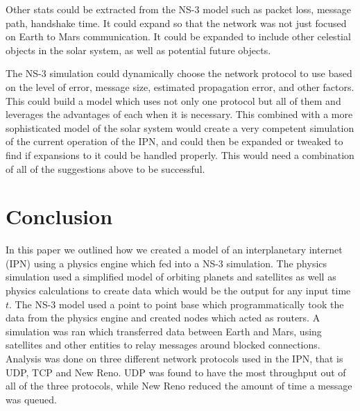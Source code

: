 \documentclass[a4paper,12pt]{article}
\begin{document}
Other stats could be extracted from the NS-3 model such as packet loss, message
path, handshake time. It could expand so that the network was not just focused
on Earth to Mars communication. It could be expanded to include other celestial
objects in the solar system, as well as potential future objects.

The NS-3 simulation could dynamically choose the network protocol to use based
on the level of error, message size, estimated propagation error, and other
factors. This could build a model which uses not only one protocol but all of
them and leverages the advantages of each when it is necessary. This combined
with a more sophisticated model of the solar system would create a very
competent simulation of the current operation of the IPN, and could then be
expanded or tweaked to find if expansions to it could be handled properly. This
would need a combination of all of the suggestions above to be successful.

\section{Conclusion}

In this paper we outlined how we created a model of an interplanetary internet
(IPN) using a physics engine which fed into a NS-3 simulation. The physics
simulation used a simplified model of orbiting planets and satellites as well as
physics calculations to create data which would be the output for any input time
$t$. The NS-3 model used a point to point base which programmatically took the
data from the physics engine and created nodes which acted as routers. A
simulation was ran which transferred data between Earth and Mars, using
satellites and other entities to relay messages around blocked connections.
Analysis was done on three different network protocols used in the IPN, that is
UDP, TCP and New Reno. UDP was found to have the most throughput out of all of
the three protocols, while New Reno reduced the amount of time a message was
queued.

\printbibliography{}
\end{document}
